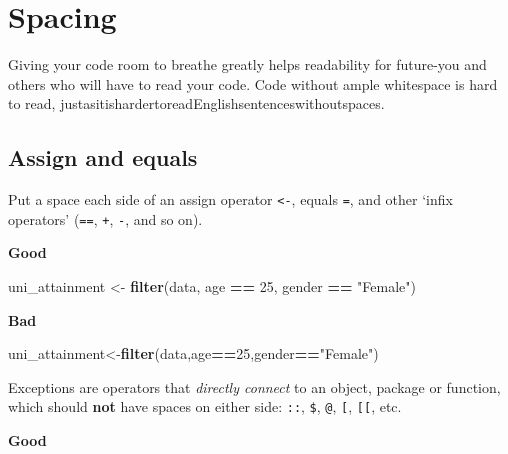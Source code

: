 \documentclass[
]{book}
\newenvironment{Shaded}{\begin{snugshade}}{\end{snugshade}}
\newcommand{\DecValTok}[1]{\textcolor[rgb]{0.00,0.00,0.81}{#1}}
\newcommand{\KeywordTok}[1]{\textcolor[rgb]{0.13,0.29,0.53}{\textbf{#1}}}
\newcommand{\NormalTok}[1]{#1}
\newcommand{\OperatorTok}[1]{\textcolor[rgb]{0.81,0.36,0.00}{\textbf{#1}}}
\newcommand{\StringTok}[1]{\textcolor[rgb]{0.31,0.60,0.02}{#1}}
\begin{document}
\hypertarget{spacing}{%
\section{Spacing}\label{spacing}}

Giving your code room to breathe greatly helps readability for future-you and others who will have to read your code. Code without ample whitespace is hard to read, justasitishardertoreadEnglishsentenceswithoutspaces.

\hypertarget{assign-and-equals}{%
\subsection{Assign and equals}\label{assign-and-equals}}

Put a space each side of an assign operator \texttt{\textless{}-}, equals \texttt{=}, and other `infix operators' (\texttt{==}, \texttt{+}, \texttt{-}, and so on).

\textbf{Good}

\begin{Shaded}
\begin{Highlighting}[]
\NormalTok{uni\_attainment \textless{}{-}}\StringTok{ }\KeywordTok{filter}\NormalTok{(data, age }\OperatorTok{==}\StringTok{ }\DecValTok{25}\NormalTok{, gender }\OperatorTok{==}\StringTok{ "Female"}\NormalTok{)}
\end{Highlighting}
\end{Shaded}

\textbf{Bad}

\begin{Shaded}
\begin{Highlighting}[]
\NormalTok{uni\_attainment\textless{}{-}}\KeywordTok{filter}\NormalTok{(data,age}\OperatorTok{==}\DecValTok{25}\NormalTok{,gender}\OperatorTok{==}\StringTok{"Female"}\NormalTok{)}
\end{Highlighting}
\end{Shaded}

Exceptions are operators that \emph{directly connect} to an object, package or function, which should \textbf{not} have spaces on either side: \texttt{::}, \texttt{\$}, \texttt{@}, \texttt{{[}}, \texttt{{[}{[}}, etc.

\textbf{Good}

\begin{Shaded}
\end{Shaded}
\end{document}

